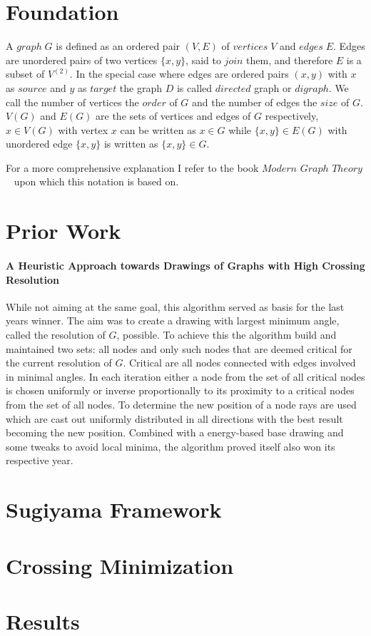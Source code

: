 \documentclass[]{article}
\begin{document}
	\section{Foundation}
	A $graph\;G$ is defined as an ordered pair $(V, E)$ of $vertices\;V$ and $edges\;E$. Edges are unordered pairs of two vertices $\{x,y\}$, said to $join$  them, and therefore $E$ is a subset of $V^{(2)}$. In the special case where edges are ordered pairs $(x,y)$ with $x$ as $source$ and $y$ as $target$ the graph $D$ is called $directed$ graph or $digraph$. We call the number of vertices the $order$ of $G$ and the number of edges the $size$ of $G$. $V(G)$ and $E(G)$ are the sets of vertices and edges of $G$ respectively, $x \in V(G)$ with vertex $x$ can be written as $x \in G$ while $\{x, y\} \in E(G)$ with unordered edge $\{x,y\}$ is written as $\{x,y\} \in G$. 

For a more comprehensive explanation I refer to the book $Modern$ $Graph$ $Theory$~\cite{bollobas98} upon which this notation is based on.

	\section{Prior Work}
	\paragraph{A Heuristic Approach towards Drawings of
Graphs with High Crossing Resolution~\cite{journals/corr/abs-1808-10519}}
	While not aiming at the same goal, this algorithm served as basis for the last years winner. The aim was to create a drawing with largest minimum angle, called the resolution of $G$,  possible. To achieve this the algorithm build and maintained two sets: all nodes and only such nodes that are deemed critical for the current resolution of $G$. Critical are all nodes connected with edges involved in minimal angles. In each iteration either a node from the set of all critical nodes is chosen uniformly or inverse proportionally to its proximity to a critical nodes from the set of all nodes. To determine the new position of a node rays are used which are cast out uniformly distributed in all directions with the best result becoming the new position. Combined with a energy-based base drawing and some tweaks to avoid local minima, the algorithm proved itself also won its respective year.

    \section{Sugiyama Framework}

    \section{Crossing Minimization}

    \section{Results}

    \printbibliography
\end{document}
